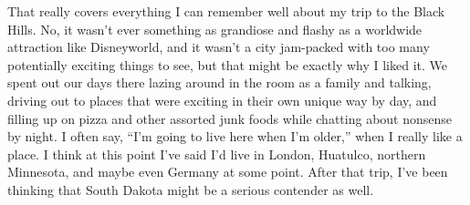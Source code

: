 \documentclass[12pt]{article}
\begin{document}
That really covers everything I can remember well about my trip to the Black Hills.  No, it wasn't ever something as grandiose and flashy as a worldwide attraction like Disneyworld, and it wasn't a city jam-packed with too many potentially exciting things to see, but that might be exactly why I liked it.  We spent out our days there lazing around in the room as a family and talking, driving out to places that were exciting in their own unique way by day, and filling up on pizza and other assorted junk foods while chatting about nonsense by night.  I often say, ``I'm going to live here when I'm older,'' when I really like a place.  I think at this point I've said I'd live in London, Huatulco, northern Minnesota, and maybe even Germany at some point.  After that trip, I've been thinking that South Dakota might be a serious contender as well.
\end{document}
